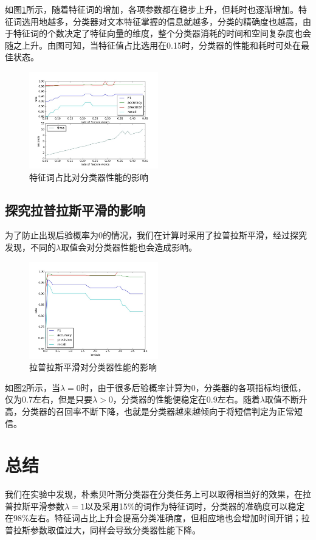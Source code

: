 \documentclass[a4paper, twocolumn, 12pt]{article}
\begin{document}
如图\ref{fig_1}所示，随着特征词的增加，各项参数都在稳步上升，但耗时也逐渐增加。特征词选用地越多，分类器对文本特征掌握的信息就越多，分类的精确度也越高，由于特征词的个数决定了特征向量的维度，整个分类器消耗的时间和空间复杂度也会随之上升。由图可知，当特征值占比选用在0.15时，分类器的性能和耗时可处在最佳状态。

\begin{figure}
    \centering
    \includegraphics[width=0.5\textwidth]{fig_1.jpg}
    \caption{特征词占比对分类器性能的影响}
    \label{fig_1}
\end{figure}

\subsection{探究拉普拉斯平滑的影响}
为了防止出现后验概率为0的情况，我们在计算时采用了拉普拉斯平滑，经过探究发现，不同的$\lambda$取值会对分类器性能也会造成影响。\\


\begin{figure}[htbp]
    \centering
    \includegraphics[width=0.5\textwidth]{fig_2.jpg}
    \caption{拉普拉斯平滑对分类器性能的影响}
    \label{fig_2}
\end{figure}

如图\ref{fig_2}所示，当$\lambda=0$时，由于很多后验概率计算为0，分类器的各项指标均很低，仅为0.7左右，但是只要$\lambda>0$，分类器的性能便稳定在0.9左右。随着$\lambda$取值不断升高，分类器的召回率不断下降，也就是分类器越来越倾向于将短信判定为正常短信。

\section{总结}
我们在实验中发现，朴素贝叶斯分类器在分类任务上可以取得相当好的效果，在拉普拉斯平滑参数$\lambda=1$以及采用15\%的词作为特征词时，分类器的准确度可以稳定在98\%左右。特征词占比上升会提高分类准确度，但相应地也会增加时间开销；拉普拉斯参数取值过大，同样会导致分类器性能下降。
\end{document}
